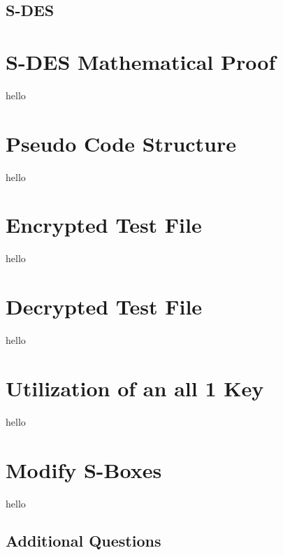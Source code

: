 \documentclass[]{article}
\begin{document}
\break

\vspace*{-0.8cm}
\begin{center}
	\section*{S-DES}
\end{center}

\vspace*{0.8cm}
\section*{S-DES Mathematical Proof}

hello

\section*{Pseudo Code Structure}

hello

\section*{Encrypted Test File}

hello

\section*{Decrypted Test File}

hello

\section*{Utilization of an all 1 Key}

hello

\section*{Modify S-Boxes}

hello

\break

\vspace*{-0.8cm}
\begin{center}
	\section*{Additional Questions}
\end{center}
\end{document}
